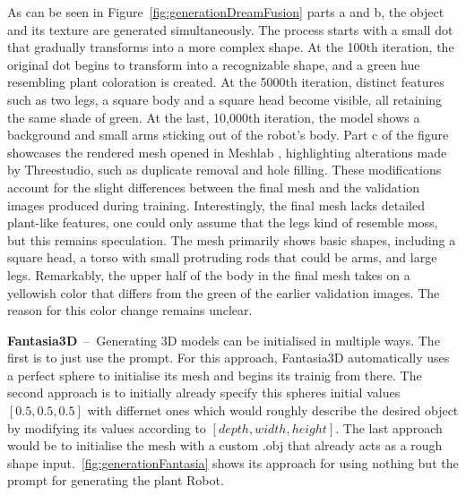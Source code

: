 As can be seen in Figure~\ref{fig:generationDreamFusion} parts a and b, the object and its texture are generated simultaneously. The process starts with a small dot that gradually transforms into a more complex shape. At the 100th iteration, the original dot begins to transform into a recognizable shape, and a green hue resembling plant coloration is created. At the 5000th iteration, distinct features such as two legs, a square body and a square head become visible, all retaining the same shade of green. At the last, 10,000th iteration, the model shows a background and small arms sticking out of the robot's body.
Part c of the figure showcases the rendered mesh opened in Meshlab \citep{meshLab}, highlighting alterations made by Threestudio, such as duplicate removal and hole filling. These modifications account for the slight differences between the final mesh and the validation images produced during training. Interestingly, the final mesh lacks detailed plant-like features, one could only assume that the legs kind of resemble moss, but this remains speculation. The mesh primarily shows basic shapes, including a square head, a torso with small protruding rods that could be arms, and large legs. Remarkably, the upper half of the body in the final mesh takes on a yellowish color that differs from the green of the earlier validation images. The reason for this color change remains unclear.

\textbf{Fantasia3D}~--~Generating 3D models can be initialised in multiple ways. The first is to just use the prompt. For this approach, Fantasia3D automatically uses a perfect sphere to initialise its mesh and begins its trainig from there. The second approach is to initially already specify this spheres initial values \([0.5, 0.5, 0.5]\) with differnet ones which would roughly describe the desired object by modifying its values according to \([depth, width, height]\). The last approach would be to initialise the mesh with a custom .obj that already acts as a rough shape input.~\ref{fig:generationFantasia} shows its approach for using nothing but the prompt for generating the plant Robot. 

